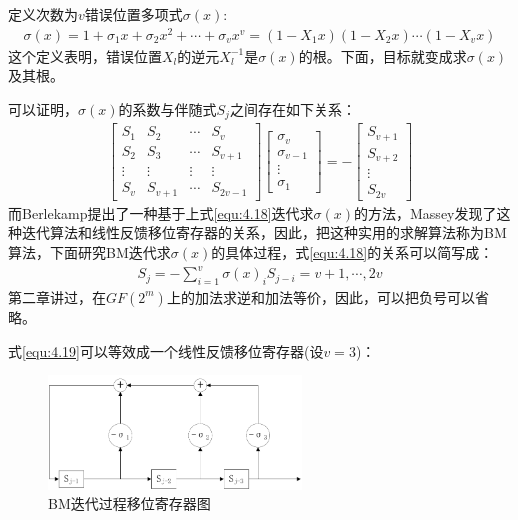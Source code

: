 定义次数为$v$错误位置多项式$\sigma(x)$:
\begin{eqnarray}
  \sigma(x)=1+\sigma_1x+\sigma_2x^2+\cdots
  +\sigma_vx^v=(1-X_1x)(1-X_2x)\cdots(1-X_vx)
  \label{equ:4.17}
\end{eqnarray}
这个定义表明，错误位置$X_l$的逆元$X_l^{-1}$是$\sigma(x)$的根。下面，目标就变成求$\sigma(x)$及其根。

可以证明\cite{Blahut_BM}，$\sigma(x)$的系数与伴随式$S_j$之间存在如下关系：
\begin{eqnarray}
  \left[
  \begin{array}{cccc}
    S_1&S_2&\cdots &S_v\\
    S_2&S_3&\cdots &S_{v+1}\\
    \vdots &\vdots &\vdots &\vdots \\
    S_v&S_{v+1}&\cdots &S_{2v-1}
  \end{array}
  \right]
  \left[
  \begin{array}{c}
    \sigma_v \\
    \sigma_{v-1}\\
    \vdots \\
    \sigma_1
  \end{array}
  \right]=-
  \left[
  \begin{array}{c}
    S_{v+1}\\
    S_{v+2}\\
    \vdots \\
    S_{2v}
  \end{array}
  \right]
  \label{equ:4.18}
\end{eqnarray}
而Berlekamp提出了一种基于上式\ref{equ:4.18}迭代求$\sigma(x)$的方法，Massey\cite{Massey_BCH}发现了这种迭代算法和线性反馈移位寄存器的关系，因此，把这种实用的求解算法称为BM算法，下面研究BM迭代\cite{ER_BCH}求$\sigma(x)$的具体过程，式\ref{equ:4.18}的关系可以简写成：
\begin{eqnarray}
  S_j=-\sum_{i=1}^v\sigma(x)_iS_{j-i}=v+1,\cdots ,2v
  \label{equ:4.19}
\end{eqnarray}
第二章讲过，在$GF(2^m)$上的加法求逆和加法等价，因此，可以把负号可以省略。

式\ref{equ:4.19}可以等效成一个线性反馈移位寄存器(设$v=3$)：
\begin{figure}[htbp]
  \begin{center}
    \includegraphics[width=0.6\textwidth]{images/BM.pdf}
  \end{center}
  \caption{BM迭代过程移位寄存器图}
  \label{fig:4.3}
\end{figure}

